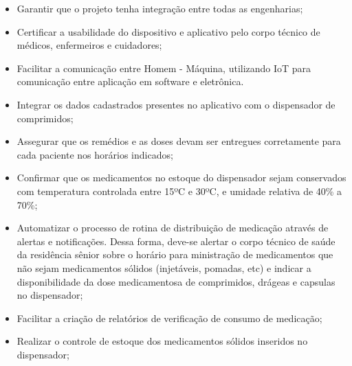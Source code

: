 \begin{itemize}
\item Garantir que o projeto tenha integração entre todas as engenharias;
\item Certificar a usabilidade do dispositivo e aplicativo pelo corpo técnico de médicos, enfermeiros e cuidadores;
\item Facilitar a comunicação entre Homem - Máquina, utilizando IoT para comunicação entre aplicação em software e eletrônica. 
\item Integrar os dados cadastrados presentes no aplicativo com o dispensador de comprimidos;
\item Assegurar que os remédios e as doses devam ser entregues corretamente para cada paciente nos horários indicados;
\item Confirmar que os medicamentos no estoque do dispensador sejam conservados com temperatura controlada entre 15ºC e 30ºC, e umidade relativa de 40\% a 70\%;
\item Automatizar o processo de rotina de distribuição de medicação através de alertas e notificações. Dessa forma, deve-se alertar o corpo técnico de saúde da residência sênior sobre o horário para ministração de medicamentos que não sejam medicamentos sólidos (injetáveis, pomadas, etc) e indicar a disponibilidade da dose medicamentosa de comprimidos, drágeas e capsulas no dispensador;
\item Facilitar a criação de relatórios de verificação de consumo de medicação;
\item Realizar o controle de estoque dos medicamentos sólidos inseridos no dispensador;

\end{itemize}







